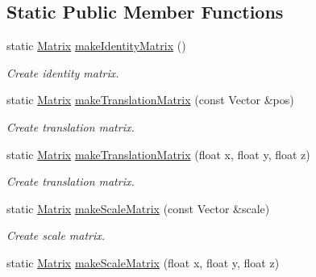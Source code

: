 \subsection*{Static Public Member Functions}
\begin{DoxyCompactItemize}
\item 
\mbox{\label{class_matrix_ad4827eed2702cf5fc64776892f8e7cf2}} 
static \mbox{\hyperlink{class_matrix}{Matrix}} \mbox{\hyperlink{class_matrix_ad4827eed2702cf5fc64776892f8e7cf2}{make\+Identity\+Matrix}} ()
\begin{DoxyCompactList}\small\item\em Create identity matrix. \end{DoxyCompactList}\item 
\mbox{\label{class_matrix_a2b885ef8d64bf0bb5362b87fa293cdff}} 
static \mbox{\hyperlink{class_matrix}{Matrix}} \mbox{\hyperlink{class_matrix_a2b885ef8d64bf0bb5362b87fa293cdff}{make\+Translation\+Matrix}} (const Vector \&pos)
\begin{DoxyCompactList}\small\item\em Create translation matrix. \end{DoxyCompactList}\item 
\mbox{\label{class_matrix_a385ec747b6123f69dafa41eea4953ada}} 
static \mbox{\hyperlink{class_matrix}{Matrix}} \mbox{\hyperlink{class_matrix_a385ec747b6123f69dafa41eea4953ada}{make\+Translation\+Matrix}} (float x, float y, float z)
\begin{DoxyCompactList}\small\item\em Create translation matrix. \end{DoxyCompactList}\item 
\mbox{\label{class_matrix_a9301699844a766d55bac58cfbc28fd8a}} 
static \mbox{\hyperlink{class_matrix}{Matrix}} \mbox{\hyperlink{class_matrix_a9301699844a766d55bac58cfbc28fd8a}{make\+Scale\+Matrix}} (const Vector \&scale)
\begin{DoxyCompactList}\small\item\em Create scale matrix. \end{DoxyCompactList}\item 
\mbox{\label{class_matrix_a2b9bd1f72c911a37d748c99b1147e021}} 
static \mbox{\hyperlink{class_matrix}{Matrix}} \mbox{\hyperlink{class_matrix_a2b9bd1f72c911a37d748c99b1147e021}{make\+Scale\+Matrix}} (float x, float y, float z)

\end{DoxyCompactItemize}
